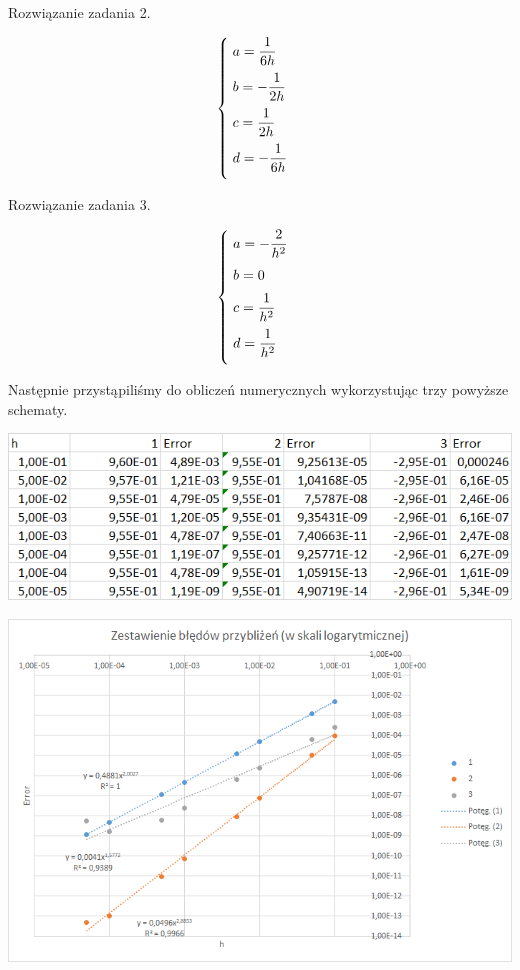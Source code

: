Rozwiązanie zadania 2.

\[
\begin{cases}
\vspace{0.2cm} 
\hspace{0,1cm}a=\dfrac{1}{6h} \\
\vspace{0.2cm}
\hspace{0,1cm}b=-\dfrac{1}{2h} \\
\vspace{0.2cm}
\hspace{0,1cm}c=\dfrac{1}{2h} \\
\vspace{0.2cm}
\hspace{0,1cm}d=-\dfrac{1}{6h}
\end{cases}
\]

Rozwiązanie zadania 3.

\[
\begin{cases}
\vspace{0.2cm} 
\hspace{0,1cm}a=-\dfrac{2}{h^2} \\
\vspace{0.2cm}
\hspace{0,1cm}b=0 \\
\vspace{0.2cm}
\hspace{0,1cm}c=\dfrac{1}{h^2} \\
\vspace{0.2cm}
\hspace{0,1cm}d=\dfrac{1}{h^2}
\end{cases}
\]

Następnie przystąpiliśmy do obliczeń numerycznych wykorzystując trzy powyższe schematy.

\newpage

\includegraphics{Lab2/charts/wsp_log_dane.png}

\includegraphics{Lab2/charts/wsp_log.png}
\newpage

